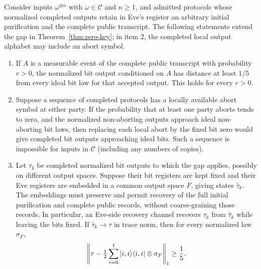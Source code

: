 \begin{proposition}
\label{prop:operational-extensions}
Consider inputs $\omega^{\otimes n}$ with $\omega\in\mathscr C$ and
$n\ge1$, and admitted protocols whose normalized completed outputs retain
in Eve's register an arbitrary initial purification and the complete
public transcript.  The following statements extend the gap in
Theorem~\ref{thm:zero-key}; in item 2, the completed local output alphabet
may include an abort symbol.
\begin{enumerate}
\item If $A$ is a measurable event of the complete public transcript
with probability $r>0$, the normalized bit output conditioned on $A$
has distance at least $1/5$ from every ideal bit law for that accepted
output.  This holds for every $r>0$.
\item Suppose a sequence of completed protocols has a locally
available abort symbol at either party.  If the probability that at
least one party aborts tends to zero, and the normalized non-aborting
outputs approach ideal non-aborting bit laws, then replacing each
local abort by the fixed bit zero would give completed bit outputs
approaching ideal bits.  Such a sequence is impossible for inputs in
$\mathscr C$ (including any numbers of copies).
\item Let $\tau_k$ be completed normalized bit outputs to which the
gap applies, possibly on different output spaces.  Suppose their bit
registers are kept fixed and their Eve registers are embedded in a
common output space $F$, giving states $\widehat\tau_k$.  The embeddings
must preserve and permit recovery of the full initial purification and
complete public records, without coarse-graining those records.  In
particular, an Eve-side recovery channel recovers $\tau_k$ from
$\widehat\tau_k$ while leaving the bits fixed.  If
$\widehat\tau_k\to\tau$ in trace norm, then for every normalized law
$\sigma_F$,
\[
 \left\lVert\tau-\tfrac12\sum_{i=0}^1
       |i,i\rangle\langle i,i|\otimes\sigma_F\right\rVert_1\ge\frac15.
\]
\end{enumerate}
\end{proposition}

